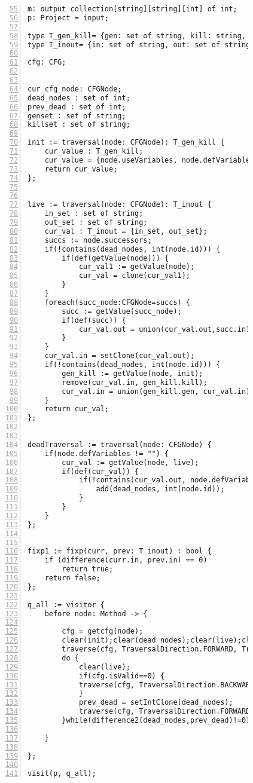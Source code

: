 \begin{figure}[ht!]
\begin{lstlisting}[numbers=left, tabsize=4, escapechar=@, caption={Dead code},label={lst:dead-code}, firstline = 55, firstnumber = 55] 
m: output collection[string][string][int] of int;
p: Project = input;

type T_gen_kill= {gen: set of string, kill: string, dummy : int};
type T_inout= {in: set of string, out: set of string};

cfg: CFG;


cur_cfg_node: CFGNode;
dead_nodes : set of int;
prev_dead : set of int;
genset : set of string;
killset : set of string;

init := traversal(node: CFGNode): T_gen_kill {
	cur_value : T_gen_kill;
	cur_value = {node.useVariables, node.defVariables, 0};
	return cur_value;
};


live := traversal(node: CFGNode): T_inout {
	in_set : set of string;
	out_set : set of string;
	cur_val : T_inout = {in_set, out_set};
	succs := node.successors;
	if(!contains(dead_nodes, int(node.id))) {
		if(def(getValue(node))) {
			cur_val1 := getValue(node);
			cur_val = clone(cur_val1);
		}
	}
	foreach(succ_node:CFGNode=succs) {
		succ := getValue(succ_node);
		if(def(succ)) {
			cur_val.out = union(cur_val.out,succ.in);
		}
	}
	cur_val.in = setClone(cur_val.out);
	if(!contains(dead_nodes, int(node.id))) {
		gen_kill := getValue(node, init);
		remove(cur_val.in, gen_kill.kill);
		cur_val.in = union(gen_kill.gen, cur_val.in);
	}
	return cur_val;
};


deadTraversal := traversal(node: CFGNode) {
	if(node.defVariables != "") {
		cur_val := getValue(node, live);
		if(def(cur_val)) {
			if(!contains(cur_val.out, node.defVariables)) {
				add(dead_nodes, int(node.id));
			}
		}
	}
};


fixp1 := fixp(curr, prev: T_inout) : bool {
	if (difference(curr.in, prev.in) == 0)
		return true;	
	return false;
};

q_all := visitor {
	before node: Method -> {
		
		cfg = getcfg(node);
		clear(init);clear(dead_nodes);clear(live);clear(prev_dead);
		traverse(cfg, TraversalDirection.FORWARD, TraversalKind.HYBRID, init);
		do {
			clear(live);
			if(cfg.isValid==0) {
			traverse(cfg, TraversalDirection.BACKWARD, TraversalKind.HYBRID, live, fixp1);
			}
			prev_dead = setIntClone(dead_nodes);
			traverse(cfg, TraversalDirection.FORWARD, TraversalKind.HYBRID, deadTraversal);
		}while(difference2(dead_nodes,prev_dead)!=0);
		
	}

};

visit(p, q_all);
\end{lstlisting}
\end{figure}